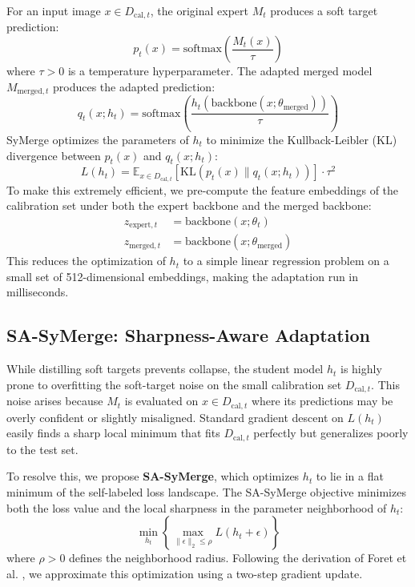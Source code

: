 \documentclass{article}
\theoremstyle{plain}
\theoremstyle{definition}
\theoremstyle{remark}
\begin{document}
For an input image $x \in D_{\text{cal}, t}$, the original expert $M_t$ produces a soft target prediction:
\begin{equation}
    p_t(x) = \text{softmax}\left(\frac{M_t(x)}{\tau}\right)
\end{equation}
where $\tau > 0$ is a temperature hyperparameter. The adapted merged model $M_{\text{merged}, t}$ produces the adapted prediction:
\begin{equation}
    q_t(x; h_t) = \text{softmax}\left(\frac{h_t(\text{backbone}(x; \theta_{\text{merged}}))}{\tau}\right)
\end{equation}
SyMerge optimizes the parameters of $h_t$ to minimize the Kullback-Leibler (KL) divergence between $p_t(x)$ and $q_t(x; h_t)$:
\begin{equation}
    L(h_t) = \mathbb{E}_{x \in D_{\text{cal}, t}} \left[ \text{KL}(p_t(x) \parallel q_t(x; h_t)) \right] \cdot \tau^2
\end{equation}
To make this extremely efficient, we pre-compute the feature embeddings of the calibration set under both the expert backbone and the merged backbone:
\begin{align}
    z_{\text{expert}, t} &= \text{backbone}(x; \theta_t) \\
    z_{\text{merged}, t} &= \text{backbone}(x; \theta_{\text{merged}})
\end{align}
This reduces the optimization of $h_t$ to a simple linear regression problem on a small set of 512-dimensional embeddings, making the adaptation run in milliseconds.

\subsection{SA-SyMerge: Sharpness-Aware Adaptation}
While distilling soft targets prevents collapse, the student model $h_t$ is highly prone to overfitting the soft-target noise on the small calibration set $D_{\text{cal}, t}$. This noise arises because $M_t$ is evaluated on $x \in D_{\text{cal}, t}$ where its predictions may be overly confident or slightly misaligned. Standard gradient descent on $L(h_t)$ easily finds a sharp local minimum that fits $D_{\text{cal}, t}$ perfectly but generalizes poorly to the test set.

To resolve this, we propose \textbf{SA-SyMerge}, which optimizes $h_t$ to lie in a flat minimum of the self-labeled loss landscape. The SA-SyMerge objective minimizes both the loss value and the local sharpness in the parameter neighborhood of $h_t$:
\begin{equation}
    \min_{h_t} \left\{ \max_{\|\epsilon\|_2 \le \rho} L(h_t + \epsilon) \right\}
\end{equation}
where $\rho > 0$ defines the neighborhood radius. Following the derivation of Foret et al. \cite{foret2020sharpness}, we approximate this optimization using a two-step gradient update.
\end{document}
